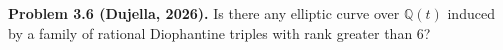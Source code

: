\textbf{Problem 3.6 (Dujella, 2026).} Is there any elliptic curve over $\mathbb{Q}(t)$ induced by a family of rational Diophantine triples with rank greater than 6?
